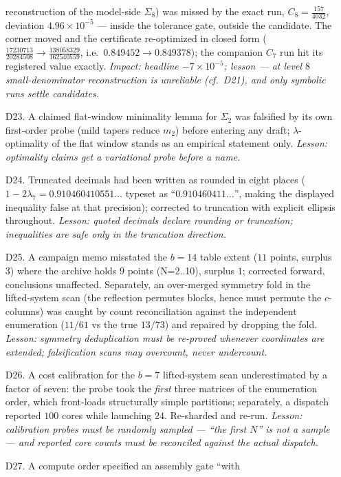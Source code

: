 \documentclass[11pt]{article}
\numberwithin{equation}{section}
\theoremstyle{definition}
\theoremstyle{remark}
\begin{document}
\begin{itemize}
reconstruction of the model-side $\Sigma_8$) was missed by the
exact run, $C_8=\tfrac{157}{4032}$, deviation
$4.96\times10^{-5}$ --- inside the tolerance gate, outside the
candidate. The corner moved and the certificate re-optimized
in closed form ($\tfrac{17230713}{20284508}\to
\tfrac{138058329}{162540559}$, i.e.\ $0.849452\to0.849378$);
the companion $C_7$ run hit its registered value exactly.
\emph{Impact: headline $-7\times10^{-5}$; lesson --- at level
$8$ small-denominator reconstruction is unreliable
(cf.\ D21), and only symbolic runs settle candidates.}
\item[D23.] A claimed flat-window minimality lemma for
$\Sigma_2$ was falsified by its own first-order probe (mild
tapers reduce $m_2$) before entering any draft;
$\lambda$-optimality of the flat window stands as an
empirical statement only. \emph{Lesson: optimality claims get
a variational probe before a name.}
\item[D24.] Truncated decimals had been written as rounded in
eight places ($1-2\lambda_7=0.910460410551\ldots$ typeset as
``$0.910460411\ldots$'', making the displayed inequality
false at that precision); corrected to truncation with
explicit ellipsis throughout. \emph{Lesson: quoted decimals
declare rounding or truncation; inequalities are safe only in
the truncation direction.}
\item[D25.] A campaign memo misstated the $b=14$ table extent
($11$ points, surplus $3$) where the archive holds $9$ points
(N=2..10), surplus $1$; corrected forward, conclusions
unaffected. Separately, an over-merged symmetry fold in the
lifted-system scan (the reflection permutes blocks, hence
must permute the $c$-columns) was caught by count
reconciliation against the independent enumeration ($11/61$
vs the true $13/73$) and repaired by dropping the fold.
\emph{Lesson: symmetry deduplication must be re-proved
whenever coordinates are extended; falsification scans may
overcount, never undercount.}
\item[D26.] A cost calibration for the $b=7$ lifted-system
scan underestimated by a factor of seven: the probe took the
\emph{first} three matrices of the enumeration order, which
front-loads structurally simple partitions; separately, a
dispatch reported $100$ cores while launching $24$.
Re-sharded and re-run. \emph{Lesson: calibration probes must
be randomly sampled --- ``the first $N$'' is not a sample
--- and reported core counts must be reconciled against the
actual dispatch.}
\item[D27.] A compute order specified an assembly gate ``with

\end{itemize}
\end{document}

